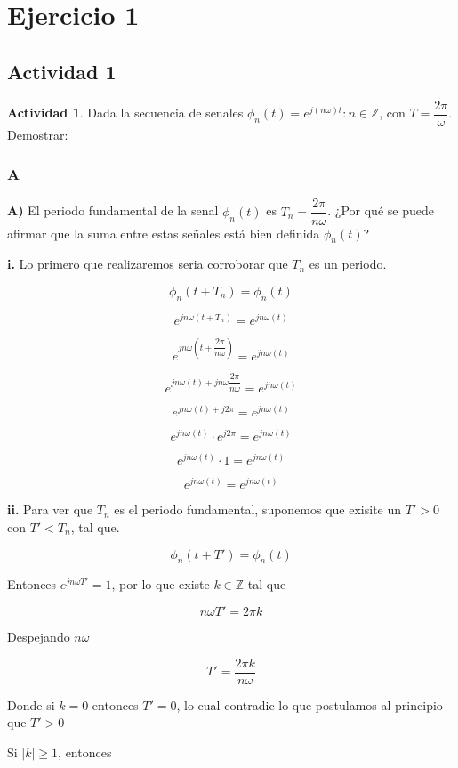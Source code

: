 \chapter{Ejercicio 1}

\section{Actividad 1}

\textbf{Actividad 1}. Dada la secuencia de senales {$\phi_{n} (t)=e^{j(n\omega)t}: n \in \mathbb{Z}$}, con $T = \dfrac{2\pi}{\omega}$. Demostrar:

\subsection{A}

\textbf{A)} El periodo fundamental de la senal $\phi_{n}(t)$ es $T_n=\dfrac{2\pi}{n\omega}$. ¿Por qué se puede afirmar que la suma entre estas señales está bien definida $\phi_{n}(t)$?

\textbf{i.} Lo primero que realizaremos seria corroborar que $T_n$ es un periodo.

$$\phi_{n}(t+T_n)=\phi_{n}(t)$$

$$e^{jn\omega(t+T_n)}=e^{jn\omega(t)}$$

$$e^{jn\omega(t+\dfrac{2\pi}{n\omega})}=e^{jn\omega(t)}$$

$$e^{jn\omega(t)+jn\omega\dfrac{2\pi}{n\omega}}=e^{jn\omega(t)}$$

$$e^{jn\omega(t)+j2\pi}=e^{jn\omega(t)}$$

$$e^{jn\omega(t)} \cdot e^{j2\pi} = e^{jn\omega(t)}$$

$$e^{jn\omega(t)} \cdot 1 = e^{jn\omega(t)}$$

$$e^{jn\omega(t)} = e^{jn\omega(t)}$$

\textbf{ii.} Para ver que $T_n$ es el periodo fundamental, suponemos que exisite un $T'>0$ con $T'<T_n$, tal que.

$$\phi_n(t+T')=\phi_n(t)$$

Entonces $e^{jn\omega T'} = 1$, por lo que existe $k \in \mathbb{Z}$ tal que

$$n\omega T'= 2\pi k$$

Despejando $n\omega$

$$T'=\dfrac{2\pi k}{n\omega}$$

Donde si $k=0$ entonces $T'=0$, lo cual contradic lo que postulamos al principio que $T'>0$

Si $|k| \ge 1$, entonces

